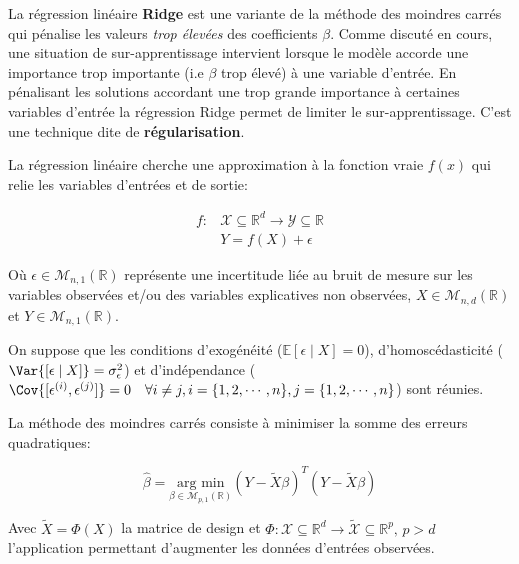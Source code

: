 \documentclass[solutions]{../exercices}
\begin{document}
	

La régression linéaire \textbf{Ridge} est une variante de la méthode des moindres carrés qui pénalise les valeurs \textit{trop élevées} des coefficients $\beta$. Comme discuté en cours, une situation de sur-apprentissage intervient lorsque le modèle accorde une importance trop importante (i.e $\beta$ trop élevé) à une variable d'entrée. En pénalisant les solutions accordant une trop grande importance à certaines variables d'entrée la régression Ridge permet de limiter le sur-apprentissage. C'est une technique dite de \textbf{régularisation}.

La régression linéaire cherche une approximation à la fonction vraie $f(x)$ qui relie les variables d'entrées et de sortie:

\begin{equation}
	\begin{aligned}
		f: &\mathcal{X} \subseteq \mathbb{R}^d \to \mathcal{Y} \subseteq \mathbb{R} \\
		&Y = f(X) + \epsilon
	\end{aligned}
	\label{eqn:problematique}
\end{equation}

Où $\epsilon \in \mathcal{M}_{n,1}(\mathbb{R})$ représente une incertitude liée au bruit de mesure sur les variables observées et/ou des variables explicatives non observées, $X \in \mathcal{M}_{n,d}(\mathbb{R})$ et $Y \in \mathcal{M}_{n,1}(\mathbb{R})$.

On suppose que les conditions d'exogénéité ($\mathbb{E}[\epsilon \mid X] = 0$), d'homoscédasticité ($\Var{[\epsilon \mid X]} = \sigma_{\epsilon}^2$) et d'indépendance ($\Cov{[\epsilon^{(i)}, \epsilon^{(j)}]} = 0 \quad \forall i \ne j, i = \{1, 2, \cdots, n\}, j = \{1, 2, \cdots, n\}$) sont réunies.

La méthode des moindres carrés consiste à minimiser la somme des erreurs quadratiques:

\begin{equation}
	\hat{\beta} = \underset{\beta \in \mathcal{M}_{p,1}(\mathbb{R})}{\text{arg min}} \left(Y - \tilde{X}\beta\right)^T \left(Y - \tilde{X}\beta\right)
	\label{eqn:moindres-carres}
\end{equation}

Avec $\tilde{X} = \Phi(X)$ la matrice de design et $\Phi: \mathcal{X} \subseteq \mathbb{R}^d \to \tilde{\mathcal{X}} \subseteq \mathbb{R}^p, \, p > d$ l'application permettant d'augmenter les données d'entrées observées.
\end{document}
